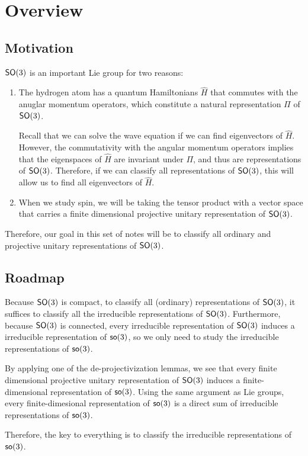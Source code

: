\section{Overview}
\subsection{Motivation}
$\operatorname{\textsf{SO}}(3)$ is an important Lie group for two reasons:
\begin{enumerate}
    \item The hydrogen atom has a quantum Hamiltonians $\hat{H}$ that commutes with the anuglar momentum operators, which constitute a natural representation $\Pi$ of $\operatorname{\textsf{SO}}(3)$.

    Recall that we can solve the wave equation if we can find eigenvectors of $\hat{H}$. However, the commutativity with the angular momentum operators implies that the eigenspaces of $\hat{H}$ are invariant under $\Pi$, and thus are representations of $\operatorname{\textsf{SO}}(3)$. Therefore, if we can classify all representations of $\operatorname{\textsf{SO}}(3)$, this will allow us to find all eigenvectors of $\hat{H}$.

    \item  When we study spin, we will be taking the tensor product with a vector space that carries a finite dimensional projective unitary representation of $\operatorname{\textsf{SO}}(3)$.
\end{enumerate}
Therefore, our goal in this set of notes will be to classify all ordinary and projective unitary representations of $\operatorname{\textsf{SO}}(3)$.

\subsection{Roadmap}
Because $\operatorname{\textsf{SO}}(3)$ is compact, to classify all (ordinary) representations of $\operatorname{\textsf{SO}}(3)$, it suffices to classify all the irreducible representations of $\operatorname{\textsf{SO}}(3)$. Furthermore, because $\operatorname{\textsf{SO}}(3)$ is connected, every irreducible representation of $\operatorname{\textsf{SO}}(3)$ induces a irreducible representation of $\operatorname{\textsf{so}}(3)$, so we only need to study the irreducible representations of $\operatorname{\textsf{so}}(3)$.

By applying one of the de-projectivization lemmas, we see that every finite dimensional projective unitary representation of $\operatorname{\textsf{SO}}(3)$ induces a finite-dimensional representation of $\operatorname{\textsf{so}}(3)$. Using the same argument as Lie groups, every finite-dimesional representation of $\operatorname{\textsf{so}}(3)$ is a direct sum of irreducible representations of $\operatorname{\textsf{so}}(3)$.

Therefore, the key to everything is to classify the irreducible representations of $\operatorname{\textsf{so}}(3)$. 
